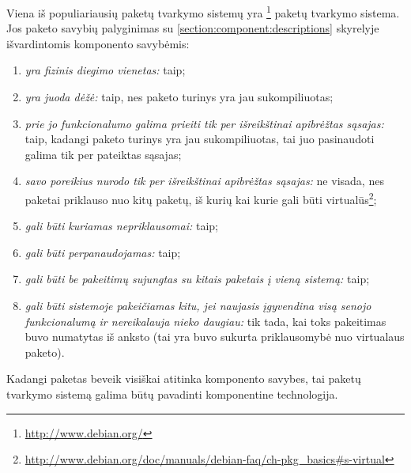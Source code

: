 Viena iš populiariausių paketų tvarkymo sistemų yra
\footnote{\url{http://www.debian.org/}} paketų
tvarkymo sistema. Jos paketo savybių palyginimas su
\ref{section:component:descriptions} skyrelyje išvardintomis
komponento savybėmis:
\begin{enumerate}
  \item \emph{yra fizinis diegimo vienetas:} taip;
  \item \emph{yra juoda dėžė:} taip, nes paketo turinys yra jau
    sukompiliuotas;
  \item \emph{prie jo funkcionalumo galima prieiti tik per
    išreikštinai apibrėžtas sąsajas:} taip, kadangi paketo turinys
    yra jau sukompiliuotas, tai juo pasinaudoti galima tik per
    pateiktas sąsajas;
  \item \emph{savo poreikius nurodo tik per išreikštinai apibrėžtas
    sąsajas:} ne visada, nes  paketai priklauso nuo
    kitų paketų, iš kurių kai kurie gali būti virtualūs\footnote{
    \url{http://www.debian.org/doc/manuals/debian-faq/ch-pkg_basics\#s-virtual}};
  \item \emph{gali būti kuriamas nepriklausomai:} taip;
  \item \emph{gali būti perpanaudojamas:} taip;
  \item \emph{gali būti be pakeitimų sujungtas su kitais paketais
    į vieną sistemą:} taip;
  \item \emph{gali būti sistemoje pakeičiamas kitu, jei naujasis
    įgyvendina visą senojo funkcionalumą ir nereikalauja nieko
    daugiau:} tik tada, kai toks pakeitimas buvo numatytas iš anksto
    (tai yra buvo sukurta priklausomybė nuo virtualaus paketo).
\end{enumerate}
Kadangi  paketas beveik visiškai atitinka komponento
savybes, tai  paketų tvarkymo sistemą galima
būtų pavadinti komponentine technologija.

